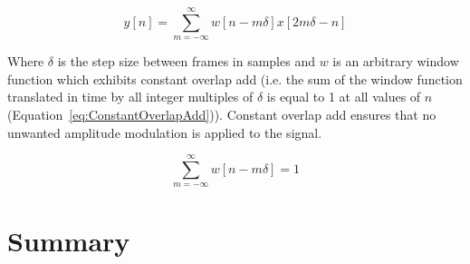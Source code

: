 		\begin{equation}
			y[n] = \sum_{m = -\infty}^{\infty} w[n - m\delta]x[2m\delta - n]
			\label{eq:STTR}
		\end{equation}

		Where $\delta$ is the step size between frames in samples and $w$ is an arbitrary window function which
		exhibits constant overlap add (i.e. the sum of the window function translated in time by all integer
		multiples of $\delta$ is equal to 1 at all values of $n$ (Equation~\ref{eq:ConstantOverlapAdd})).  Constant
		overlap add ensures that no unwanted amplitude modulation is applied to the signal.

		\begin{equation}
			\sum_{m = -\infty}^{\infty} w[n - m\delta] = 1
			\label{eq:ConstantOverlapAdd}
		\end{equation}
	
\section{Summary}
\label{sec:Excitation-Summary}
